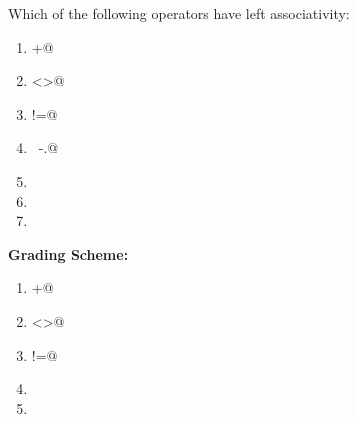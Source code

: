 \documentclass[addpoints,11pt]{exam}
\newcommand{\grade}[1]{{\color{red}\textbf{Grading Scheme:} #1}}
\begin{document}
\begin{questions}
\begin{solution}
{}
\end{solution}

\question Which of the following operators have left associativity:
\begin{enumerate}
\item \lstinline@+@
\item \lstinline@<>@
\item \lstinline@!=@
\item \lstinline@~-.@
\item \lstinline@mod@
\item \lstinline@lsr@
\item \lstinline@lnot@
\end{enumerate}
\begin{solution}
\grade{
\begin{enumerate}
\item \lstinline@+@
\item \lstinline@<>@
\item \lstinline@!=@
\item \lstinline@mod@
\item \lstinline@lnot@
\end{enumerate}
}
\end{solution}

\end{questions}
\end{document}
